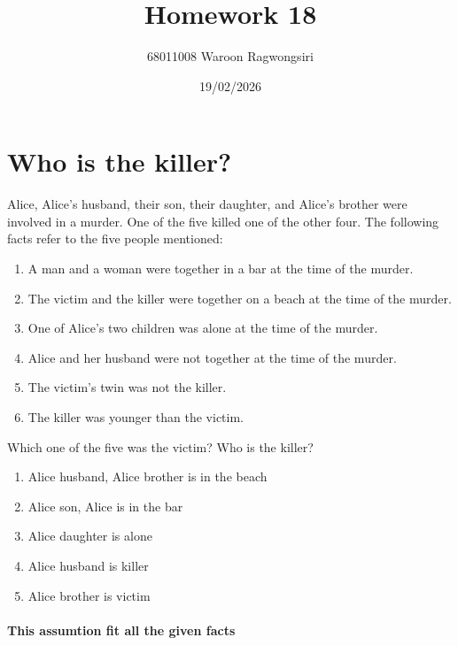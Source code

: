 \documentclass{article}
\title{Homework 18}
\author{68011008 Waroon Ragwongsiri}
\date{19/02/2026}
\begin{document}
\maketitle

{\small
\section{Who is the killer?}
}
Alice, Alice's husband, their son, their daughter, and Alice's brother were involved in a murder.
One of the five killed one of the other four. The following facts refer to the five people mentioned:

\begin{enumerate}
	\item A man and a woman were together in a bar at the time of the murder.
	\item The victim and the killer were together on a beach at the time of the murder.
	\item One of Alice's two children was alone at the time of the murder.
	\item Alice and her husband were not together at the time of the murder.
	\item The victim's twin was not the killer.
	\item The killer was younger than the victim.
\end{enumerate}

Which one of the five was the victim? Who is the killer?

\begin{enumerate}
	\item Alice husband, Alice brother is in the beach
	\item Alice son, Alice is in the bar
	\item Alice daughter is alone

	\item Alice husband is killer
	\item Alice brother is victim
\end{enumerate}
\paragraph{This assumtion fit all the given facts}
\end{document}
